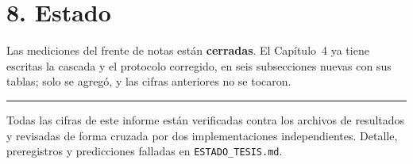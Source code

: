 \documentclass[11pt,a4paper]{article}
\begin{document}
\section*{8. Estado}

Las mediciones del frente de notas están \textbf{cerradas}. El Capítulo~4 ya tiene escritas la
cascada y el protocolo corregido, en seis subsecciones nuevas con sus tablas; solo se agregó, y las
cifras anteriores no se tocaron.

\vspace{0.6em}
\hrule
\vspace{0.5em}
{\footnotesize Todas las cifras de este informe están verificadas contra los archivos de resultados
y revisadas de forma cruzada por dos implementaciones independientes. Detalle, preregistros y
predicciones falladas en \texttt{ESTADO\_TESIS.md}.}
\end{document}
